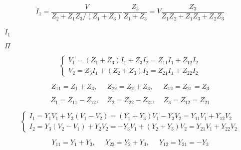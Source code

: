 {\newpage\clearpage
{}%
\begin{displaymath} \dot{I}_1=\frac{V}{Z_2+Z_1 Z_3/(Z_1+Z_3)}\frac{Z_3}{Z_1+Z_3}
=V \frac{Z_3}{Z_1Z_2+Z_1Z_3+Z_2Z_3} \end{displaymath}%
\lthtmldisplayZ
\lthtmlcheckvsize\clearpage}

{\newpage\clearpage
{}%
$\dot{I}_1$%
\lthtmlinlinemathZ
\lthtmlcheckvsize\clearpage}

{\newpage\clearpage
{}%
$\Pi$%
\lthtmlinlinemathZ
\lthtmlcheckvsize\clearpage}

{\newpage\clearpage
{}%
\begin{displaymath}	\left\{ \begin{array}{l} V_1=(Z_1+Z_3)I_1+Z_3I_2=Z_{11}I_1+Z_{12}I_2 \\
      V_2=Z_3I_1+(Z_2+Z_3)I_2=Z_{21}I_1+Z_{22}I_2  \end{array} \right. \end{displaymath}%
\lthtmldisplayZ
\lthtmlcheckvsize\clearpage}

{\newpage\clearpage
{}%
\begin{displaymath} Z_{11}=Z_1+Z_3,\;\;\;\;\;Z_{22}=Z_2+Z_3,\;\;\;\;\;Z_{12}=Z_{21}=Z_3	\end{displaymath}%
\lthtmldisplayZ
\lthtmlcheckvsize\clearpage}

{\newpage\clearpage
{}%
\begin{displaymath} Z_1=Z_{11}-Z_{12},\;\;\;\;Z_2=Z_{22}-Z_{21},\;\;\;\;Z_3=Z_{12}=Z_{21} \end{displaymath}%
\lthtmldisplayZ
\lthtmlcheckvsize\clearpage}

{\newpage\clearpage
{}%
\begin{displaymath} \left\{ \begin{array}{l} 
      I_1=Y_1V_1+Y_3(V_1-V_2)=(Y_1+Y_3)V_1-Y_3V_2=Y_{11}V_1+Y_{12}V_2 \\
      I_2=Y_3(V_2-V_1)+Y_2V_2=-Y_3V_1+(Y_2+Y_3)V_2=Y_{21}V_1+Y_{22}V_2 \end{array} \right. \end{displaymath}%
\lthtmldisplayZ
\lthtmlcheckvsize\clearpage}

{\newpage\clearpage
{}%
\begin{displaymath} Y_{11}=Y_1+Y_3,\;\;\;\;\;Y_{22}=Y_2+Y_3,\;\;\;\;\;Y_{12}=Y_{21}=-Y_3	\end{displaymath}%
\lthtmldisplayZ
\lthtmlcheckvsize\clearpage}

